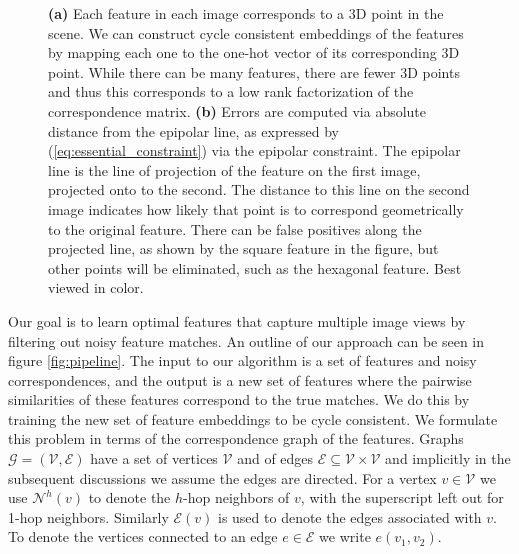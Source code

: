 \documentclass{article} %
\begin{document}
\begin{figure}[t]
\begin{subfigure}[b]{.45\linewidth}
  \label{fig:1b}
  \label{fig:geoconsist}
\end{subfigure}
\caption{
  \textbf{(a)} Each feature in each image corresponds to a 3D point in the scene.
  We can construct cycle consistent embeddings of the features by mapping each one to the one-hot vector of its corresponding 3D point.
  While there can be many features, there are fewer 3D points and thus this corresponds to a low rank factorization of the correspondence matrix.
  \textbf{(b)} Errors are computed via absolute distance from the epipolar line, as expressed by (\ref{eq:essential_constraint}) via the epipolar constraint.
  The epipolar line is the line of projection of the feature on the first image, projected onto to the second.
  The distance to this line on the second image indicates how likely that point is to correspond geometrically to the original feature.
  There can be false positives along the projected line, as shown by the square feature in the figure, but other points will be eliminated, such as the hexagonal feature.
  Best viewed in color.
}
\label{fig:1}
\end{figure}

Our goal is to learn optimal features that capture multiple image views by filtering out noisy feature matches.
An outline of our approach can be seen in figure \ref{fig:pipeline}.
The input to our algorithm is a set of features and noisy correspondences, and the output is a new set of features where the pairwise similarities of these features correspond to the true matches.
We do this by training the new set of feature embeddings to be cycle consistent.
We formulate this problem in terms of the correspondence graph of the features.
Graphs $\mathcal{G} = (\mathcal{V}, \mathcal{E})$ have a set of vertices $\mathcal{V}$ and of edges $\mathcal{E} \subseteq \mathcal{V} \times \mathcal{V}$ and implicitly in the subsequent discussions we assume the edges are directed.
For a vertex $v \in \mathcal{V}$ we use $\mathcal{N}^{h}(v)$ to denote the $h$-hop neighbors of $v$, with the superscript left out for 1-hop neighbors.
Similarly $\mathcal{E}(v)$ is used to denote the edges associated with $v$.
To denote the vertices connected to an edge $e \in \mathcal{E}$ we write $e(v_1, v_2)$.
\end{document}
